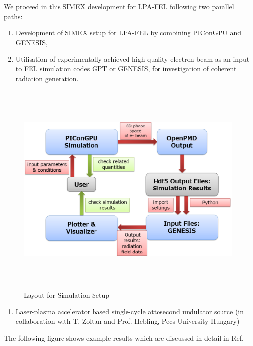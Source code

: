 We proceed in this SIMEX development for LPA-FEL following two parallel paths:
\begin{enumerate}
  \item Development of SIMEX setup for LPA-FEL by combining PIConGPU and GENESIS,
  \item Utilisation of experimentally achieved high quality electron beam as an
    input to FEL simulation codes GPT \cite{gpt_online} or
    GENESIS\cite{genesis_online}, for investigation of coherent
    radiation generation.
\end{enumerate}


\begin{figure}
  \includegraphics[width=5.9425in,height=4.1882in]{figures/lwfafel-img002.png}
  \caption{Layout for Simulation Setup}
  \label{lwfa-fig2}
\end{figure}

\begin{enumerate}
\item Laser-plasma accelerator based single-cycle attosecond undulator source
(in collaboration with T. Zoltan and Prof. Hebling, Pecs University Hungary)
\end{enumerate}


The following figure shows example results which are discussed in detail in
Ref.~\cite{Tibai2017}

